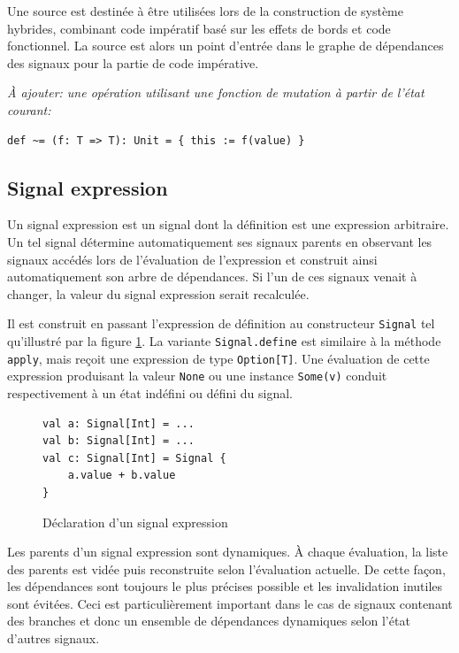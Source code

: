 Une source est destinée à être utilisées lors de la construction de système hybrides, combinant code impératif basé sur les effets de bords et code fonctionnel. La source est alors un point d'entrée dans le graphe de dépendances des signaux pour la partie de code impérative.

\textit{À ajouter: une opération utilisant une fonction de mutation à partir de l'état courant:}
\begin{lstlisting}
def ~= (f: T => T): Unit = { this := f(value) }
\end{lstlisting}

\subsection{Signal expression} \label{sec:sig-expr}

Un signal expression est un signal dont la définition est une expression arbitraire. Un tel signal détermine automatiquement ses signaux parents en observant les signaux accédés lors de l'évaluation de l'expression et construit ainsi automatiquement son arbre de dépendances. Si l'un de ces signaux venait à changer, la valeur du signal expression serait recalculée.

Il est construit en passant l'expression de définition au constructeur \texttt{Signal} tel qu'illustré par la figure \ref{fig:signal-expr-init}. La variante \texttt{Signal.define} est similaire à la méthode \texttt{apply}, mais reçoit une expression de type \texttt{Option[T]}. Une évaluation de cette expression produisant la valeur \texttt{None} ou une instance \texttt{Some(v)} conduit respectivement à un état indéfini ou défini du signal.

\begin{figure}[!h]
	\begin{lstlisting}
val a: Signal[Int] = ...
val b: Signal[Int] = ...
val c: Signal[Int] = Signal {
	a.value + b.value
}
	\end{lstlisting}
	\caption{Déclaration d'un signal expression}
	\label{fig:signal-expr-init}
\end{figure}

Les parents d'un signal expression sont dynamiques. À chaque évaluation, la liste des parents est vidée puis reconstruite selon l'évaluation actuelle. De cette façon, les dépendances sont toujours le plus précises possible et les invalidation inutiles sont évitées. Ceci est particulièrement important dans le cas de signaux contenant des branches et donc un ensemble de dépendances dynamiques selon l'état d'autres signaux.

